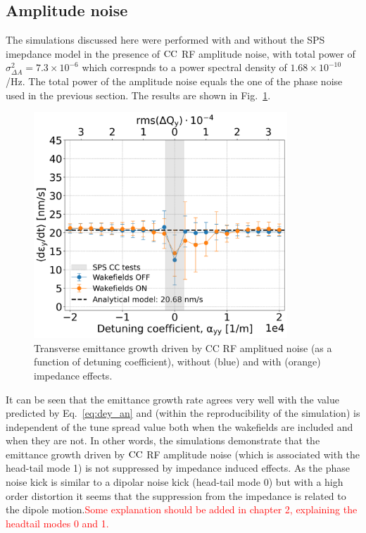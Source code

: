 \subsection{Amplitude noise}\label{subsec:amplitude_noise}
The simulations discussed here were performed with and without the SPS imepdance model in the presence of ${\mathrm{CC}}$ RF amplitude noise, with total power of $\sigma_{\Delta A}^2=7.3\times 10^{-6}$ which correspnds to a power spectral density of $1.68 \times 10^{-10}$/Hz. The total power of the amplitude noise equals the one of the phase noise used in the previous section. The results are shown in Fig.~\ref{fig:study_1_2018_paramters_AN}.

\begin{figure}[!h] %
    \centering         
    \includegraphics[width=0.85\textwidth]{images/Ch7/deyRates_final_2018_AN_sps_270GeV_AN1e-8_400MHz_y-plane_QpxQpy5e-1_6D_Nb5e5_intensity3e10_ayyScan_wakesON_vs_OFF_vs_TuneSpreadvsExpectedSPS.png}
        \caption{Transverse emittance growth driven by CC RF amplitued noise (as a function of detuning coefficient), without (blue) and with (orange) impedance effects.}
        \label{fig:study_1_2018_paramters_AN}
 \end{figure}

 It can be seen that the emittance growth rate agrees very well with the value predicted by Eq.~\eqref{eq:dey_an} and (within the reproducibility of the simulation) is independent of the tune spread value both when the wakefields are included and when they are not. In other words, the simulations demonstrate that the emittance growth driven by ${\mathrm{CC}}$ RF amplitude noise (which is associated with the head-tail mode 1) is not suppressed by impedance induced effects. As the phase noise kick is similar to a dipolar noise kick (head-tail mode 0) but with a high order distortion it seems that the suppression from the impedance is related to the dipole motion.\textcolor{red}{Some explanation should be added in chapter 2, explaining the headtail modes 0 and 1.}

